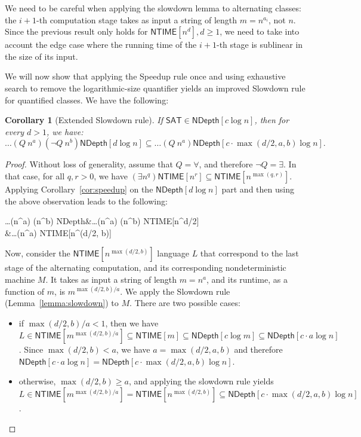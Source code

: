 \documentclass[a4paper, 11pt]{article}
\theoremstyle{plain}
\newtheorem{corollary}[theorem]{Corollary}
\theoremstyle{definition}
\theoremstyle{remark}
\newcommand{\NTIME}{\textsf{NTIME}}%
\newcommand{\SAT}{\textsf{SAT}}%
\newcommand{\ND}{\textsf{NDepth}}%
\newcommand{\NDL}[1]{\ND\left[ #1 \log n\right]}%
\begin{document}
We need to be careful when applying the slowdown lemma to alternating classes:
the $i+1$-th computation stage takes as input a string of length $m = n^{a_i}$, not $n$.
Since the previous result only holds for $\NTIME[n^d], d \ge 1$, 
we need to take into account the edge case where the running time of
the $i+1$-th stage is sublinear in the size of its input.

We will now show that applying the Speedup rule once and
using exhaustive search to remove the logarithmic-size quantifier
yields an improved Slowdown rule for quantified classes.
We have the following:
\begin{corollary}[Extended Slowdown rule]\label{cor:extended_slowdown}
	If $\SAT{}\in \NDL{c}$, then for every $d > 1$, we have:
	\[\ldots (Q~n^{a}) (\neg Q~n^b) \NDL{d}
	\subseteq \ldots (Q~n^{a}) \NDL{c\cdot\max(d/2, a, b)}.\]
\end{corollary}
\begin{proof}
	Without loss of generality, assume that $Q = \forall$, and therefore $\neg Q = \exists$.
	In that case, for all $q, r > 0$, we have $(\exists n^q) \NTIME[n^r] \subseteq \NTIME[n^{\max(q,r)}] $.
	Applying Corollary~\ref{cor:speedup} on the $\NDL{d}$ part and then using the 
	above observation leads to the following:
	\begin{flalign*}
	\ldots (\forall n^{a}) (\exists n^b) \NDL{d} 
		&\subseteq \ldots (\forall n^{a}) (\exists n^b) \NTIME[n^{d/2}]\\	
		&\subseteq \ldots (\forall n^{a}) \NTIME[n^{\max(d/2, b)}]	
	\end{flalign*}

	Now, consider the $\NTIME[n^{\max(d/2, b)}]$ language $L$
	that correspond to the last stage of the alternating 
	computation, and its corresponding nondeterministic machine $M$. 
	It takes as input a string of length $m = n^{a}$, and its runtime, as a function of $m$, 
	is $m^{\max(d/2, b)/a}$.
	We apply the Slowdown rule (Lemma~\ref{lemma:slowdown}) to $M$. There are two possible cases:
	\begin{itemize}
		\item if $\max(d/2, b)/a < 1$, then we have 
		$L \in \NTIME[m^{\max(d/2, b)/a}] \subseteq \NTIME[m]
		\subseteq \ND[c \log m] \subseteq \NDL{c \cdot a}$.
		Since  $\max(d/2, b) < a$, we have $a = \max(d/2, a, b)$ and therefore 
		$\NDL{c \cdot a} = \NDL{c\cdot\max(d/2, a, b)}$.
		\item otherwise, $\max(d/2, b) \ge a$, and applying the slowdown rule yields
		$L \in \NTIME[m^{\max(d/2, b)/a}] =  \NTIME[n^{\max(d/2, b)}] \subseteq \NDL{c \cdot \max(d/2, a, b)}$.
	\end{itemize}
\end{proof}
\end{document}
